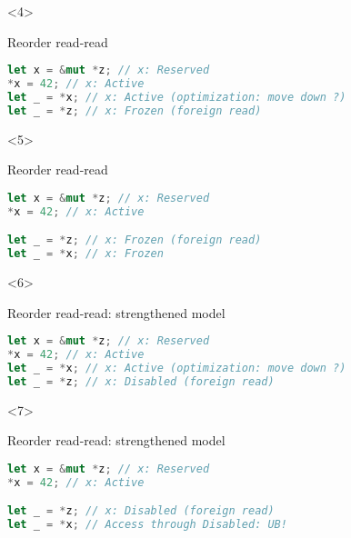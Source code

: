 \begin{frame}[fragile, t]
    \begin{onlyenv}<4>
        \begin{block}{{\cmark} Reorder read-read}
            \begin{lstlisting}[language=rust]
let x = &mut *z; // x: Reserved
*x = 42; // x: Active
let _ = *x; // x: Active (optimization: move down ?)
let _ = *z; // x: Frozen (foreign read)

            \end{lstlisting}
        \end{block}
    \end{onlyenv}

    \begin{onlyenv}<5>
        \begin{block}{{\cmark} Reorder read-read}
            \begin{lstlisting}[language=rust]
let x = &mut *z; // x: Reserved
*x = 42; // x: Active

let _ = *z; // x: Frozen (foreign read)
let _ = *x; // x: Frozen
            \end{lstlisting}
        \end{block}
    \end{onlyenv}

    \begin{onlyenv}<6>
        \begin{block}{{\xmark} Reorder read-read: strengthened model}
            \begin{lstlisting}[language=rust]
let x = &mut *z; // x: Reserved
*x = 42; // x: Active
let _ = *x; // x: Active (optimization: move down ?)
let _ = *z; // x: Disabled (foreign read)

            \end{lstlisting}
        \end{block}
    \end{onlyenv}

    \begin{onlyenv}<7>
        \begin{block}{{\xmark} Reorder read-read: strengthened model}
            \begin{lstlisting}[language=rust]
let x = &mut *z; // x: Reserved
*x = 42; // x: Active

let _ = *z; // x: Disabled (foreign read)
let _ = *x; // Access through Disabled: UB!
            \end{lstlisting}
        \end{block}
    \end{onlyenv}
\end{frame}

